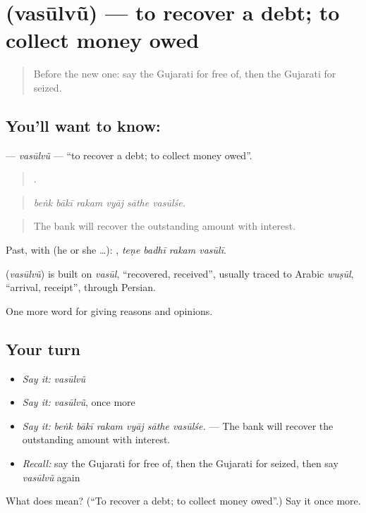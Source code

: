\section[\texorpdfstring{\gu{વસૂલવું} (vasūlvũ)}{વસૂલવું (vasūlvũ)}]{ (vasūlvũ) — to recover a debt; to collect money owed}

\label{lesson:GU-C350-vasulvu}



\begin{quote}
Before the new one: say the Gujarati for free of, then the Gujarati for seized.
\end{quote}

\subsection*{You'll want to know: }
\textbf{} — \emph{vasūlvũ} — \textquotedblleft{}to recover a debt; to collect money owed\textquotedblright{}.

\begin{quote}
     .
\end{quote}

\begin{quote}
\emph{beṅk bākī rakam vyāj sāthe vasūlśe.}
\end{quote}

\begin{quote}
The bank will recover the outstanding amount with interest.
\end{quote}

Past, with  (he or she …):    , \emph{teṇe badhī rakam vasūlī}.

\begin{cousinweb}
\textbf{} (\emph{vasūlvũ}) is built on \emph{vasūl}, \textquotedblleft{}recovered, received\textquotedblright{}, usually traced to Arabic \emph{wuṣūl}, \textquotedblleft{}arrival, receipt\textquotedblright{}, through Persian.
\end{cousinweb}

\begin{grammarlens}[title={What you've built}]
One more word for giving reasons and opinions.
\end{grammarlens}

\subsection*{Your turn}
\begin{itemize}
\raggedright
  \item \emph{Say it:} \emph{vasūlvũ}
  \item \emph{Say it:} \emph{vasūlvũ}, once more
  \item \emph{Say it:} \emph{beṅk bākī rakam vyāj sāthe vasūlśe.} — The bank will recover the outstanding amount with interest.
  \item \emph{Recall:} say the Gujarati for free of, then the Gujarati for seized, then say \emph{vasūlvũ} again
\end{itemize}

\begin{tcolorbox}[breakable,colback=teal!4,colframe=teal!35!black,title={Before you move on}]
What does  mean? (\textquotedblleft{}To recover a debt; to collect money owed\textquotedblright{}.) Say it once more.
\end{tcolorbox}
